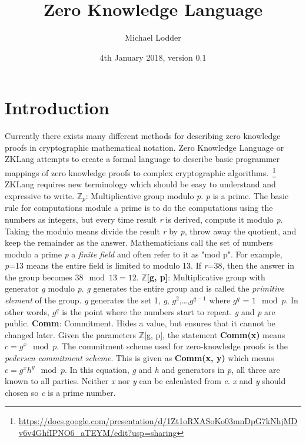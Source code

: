 \documentclass[a4paper]{article}
\title{Zero Knowledge Language}
\author{Michael Lodder}
\date{4th January 2018, version 0.1}
\begin{document}
\maketitle

\section{Introduction}

Currently there exists many different methods for describing zero knowledge proofs in cryptographic mathematical notation. Zero Knowledge Language or ZKLang attempts to create a formal language to describe basic programmer mappings of zero knowledge proofs to complex cryptographic algorithms.~\footnote{\url{https://docs.google.com/presentation/d/1Zt1oRXASoKo03mnDpG7kNhjMDv6v4GhfIPNO6_aTEYM/edit?usp=sharing}}
\newline
ZKLang requires new terminology which should be easy to understand and expressive to write.
\newline
\newline
\indent $\mathbb{Z}_p$: Multiplicative group modulo \emph{p}. \emph{p} is a prime. The basic rule for computations module a prime is to do the computations using the numbers as integers, but every time result \emph{r} is derived, compute it modulo \emph{p}. Taking the modulo means divide the result \emph{r} by \emph{p}, throw away the quotient, and keep the remainder as the answer. Mathematicians call the set of numbers modulo a prime \emph{p} a \emph{finite field} and often refer to it as "mod p". For example, \emph{p}=13 means the entire field is limited to modulo 13. If \emph{r}=38, then the answer in the group becomes $38\mod{13}=12$. \newline
\newline
\indent $\mathbb{Z}$\textbf{[g, p]}: Multiplicative group with generator \emph{g} modulo \emph{p}. \emph{g} generates the entire group and is called the \emph{primitive element} of the group. \emph{g} generates the set 1, \emph{g}, \emph{$g^2$},\dots,\emph{$g^{q-1}$} where \emph{$g^q$} = $1\mod{p}$. In other words, \emph{$g^q$} is the point where the numbers start to repeat. \emph{g} and \emph{p} are public.\newline
\newline
\indent \textbf{Comm}: Commitment. Hides a value, but ensures that it cannot be changed later. Given the parameters $\mathbb{Z}$[g, p], the statement \textbf{Comm(x)} means  $c=g^x\mod{p}$. The commitment scheme used for zero-knowledge proofs is the \emph{pedersen commitment scheme}. This is given as \textbf{Comm(x, y)} which means $c=g^xh^y\mod{p}$. In this equation, \emph{g} and \emph{h} and generators in \emph{p}, all three are known to all parties. Neither \emph{x} nor \emph{y} can be calculated from \emph{c}. \emph{x} and \emph{y} should chosen so \emph{c} is a prime number.\newline
\newline
\end{document}
